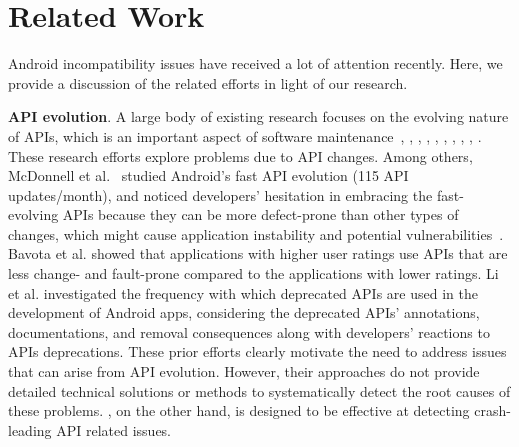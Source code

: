 \section{Related Work}\label{sec-related}
\vspace{-0.1cm}
Android incompatibility issues have received a lot of
attention recently. Here, we provide a discussion of the
related efforts in light of our research.

\textbf{API evolution}. A large body of existing
research focuses on the evolving nature of APIs, which
is an important aspect of software
maintenance~\cite{mcdonnell2013empirical},
\cite{bavota2015impact}, \cite{ACRYL_Scalabrino2019},
\cite{li2018characterising},
\cite{lamothe2018exploring}, \cite{linares2013api},
\cite{Luo2018},
\cite{Fazzini:2017:ACI:3155562.3155604},
\cite{mahmoudi2018android}, \cite{mutchler2016target}.
These research efforts explore problems due to API
changes. Among others, McDonnell et
al.~\cite{mcdonnell2013empirical} studied Android's
fast API evolution (115 API updates/month), and noticed
developers' hesitation in embracing the fast-evolving
APIs because they can be more defect-prone than other
types of changes, which might cause application
instability and potential
vulnerabilities~\cite{linares2013api}.  
Bavota et al.  \cite{bavota2015impact}
showed that applications with higher user ratings use
APIs that are less change- and fault-prone compared to
the applications with lower ratings. 
Li et al.  \cite{li2018characterising} investigated the
frequency with which deprecated APIs are used in the
development of Android apps, considering the deprecated
APIs' annotations, documentations, and removal
consequences along with developers' reactions to APIs
deprecations. 
%
%
%
%
These prior efforts clearly motivate the need to address
issues that can arise from API evolution.  However, their
approaches do not provide detailed technical solutions or
methods to systematically detect the root causes of these
problems.  \textsc{\@approach}, on the other hand, is
designed to be effective at detecting crash-leading API
related issues.



